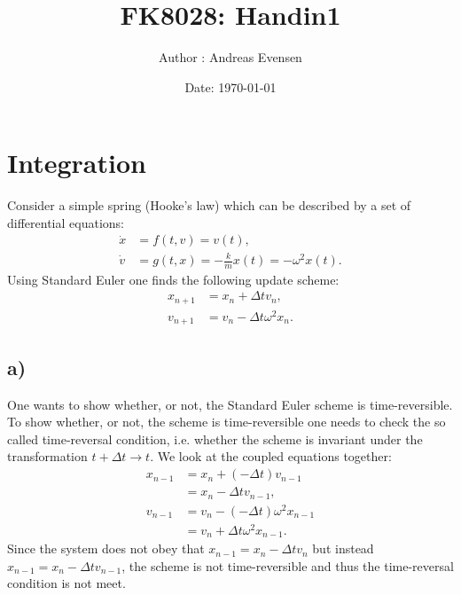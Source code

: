 \documentclass[a4paper]{article}
\title{FK8028: Handin1}
\author{Author : Andreas Evensen}
\date{Date: \today}
\newcommand{\w}{\omega}
\newcommand{\nl}{\\\newline\noindent}
\begin{document}
\maketitle

\section*{Integration}
Consider a simple spring (Hooke's law) which can be described by a set of differential equations:
\begin{align*}
    \dot{x} &= f(t, v) = v(t),\\
    \dot{v} &= g(t, x) = -\frac{k}{m}x(t)=-\w^2x(t).
\end{align*}Using Standard Euler one finds the following update scheme:
\begin{align}
    x_{n+1} &= x_n + \Delta t v_n,\label{eq: Stanrdard Euler}\\
    v_{n+1} &= v_n - \Delta t \w^2 x_n.\nonumber
\end{align}
\subsection*{a)}
One wants to show whether, or not, the Standard Euler scheme is time-reversible.
\nl
To show whether, or not, the scheme is time-reversible one needs to check the so called time-reversal condition, i.e. whether the scheme is invariant under the transformation $t + \Delta t\rightarrow t$.
We look at the coupled equations together:
\begin{align*}
    x_{n-1} &= x_n + (-\Delta t) v_{n-1}\\
    &= x_n - \Delta tv_{n-1},\\
    v_{n-1} &= v_n - (-\Delta t) \w^2 x_{n-1}\\
    &= v_n + \Delta t \w^2 x_{n-1}.
\end{align*}Since the system does not obey that $x_{n-1} = x_n - \Delta t v_n$ but instead $x_{n-1} = x_n - \Delta t v_{n-1}$, the scheme is not time-reversible and thus the time-reversal condition is not meet.
\end{document}
